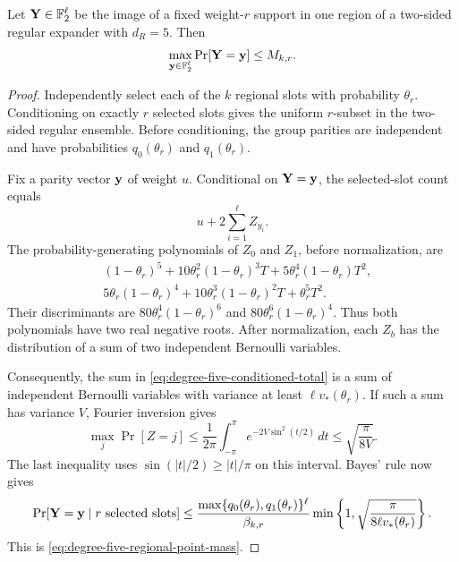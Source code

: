 \begin{lemma}
\label{lem:degree-five-point-mass}
Let $\mathbf Y\in\mathbb F_2^\ell$ be the image of a fixed weight-$r$ support in
one region of a two-sided regular expander with $d_R=5$.  Then
\begin{equation}
 \max_{\mathbf y\in\mathbb F_2^\ell}\Pr[\mathbf Y=\mathbf y]\leq M_{k,r}.
 \label{eq:degree-five-regional-point-mass}
\end{equation}
\end{lemma}

\begin{proof}
Independently select each of the $k$ regional slots with probability $\theta_r$.
Conditioning on exactly $r$ selected slots gives the uniform $r$-subset in
the two-sided regular ensemble.  Before conditioning, the group parities are
independent and have probabilities $q_0(\theta_r)$ and $q_1(\theta_r)$.

Fix a parity vector $\mathbf y$ of weight $u$.  Conditional on $\mathbf Y=\mathbf y$, the
selected-slot count equals
\begin{equation}
 u+2\sum_{i=1}^{\ell} Z_{y_i}.
 \label{eq:degree-five-conditioned-total}
\end{equation}
The probability-generating polynomials of $Z_0$ and $Z_1$, before
normalization, are
\begin{align*}
 &(1-\theta_r)^5+10\theta_r^2(1-\theta_r)^3T
   +5\theta_r^4(1-\theta_r)T^2,\\
 &5\theta_r(1-\theta_r)^4+10\theta_r^3(1-\theta_r)^2T
   +\theta_r^5T^2.
\end{align*}
Their discriminants are $80\theta_r^4(1-\theta_r)^6$ and
$80\theta_r^6(1-\theta_r)^4$.  Thus both polynomials have two real negative
roots.
After normalization, each $Z_b$ has the distribution of a sum of two
independent Bernoulli variables.

Consequently, the sum in \eqref{eq:degree-five-conditioned-total} is a sum
of independent Bernoulli variables with variance at least
$\ell v_*(\theta_r)$.  If such a sum has variance $V$, Fourier inversion gives
\begin{equation}
 \max_j\Pr[Z=j]
 \leq\frac1{2\pi}\int_{-\pi}^{\pi}
 e^{-2V\sin^2(t/2)}\,dt
 \leq\sqrt{\frac{\pi}{8V}}.
 \label{eq:poisson-binomial-local-mass}
\end{equation}
The last inequality uses $\sin(|t|/2)\geq |t|/\pi$ on this interval.
Bayes' rule now gives
\begin{equation*}
 \Pr[\mathbf Y=\mathbf y\mid\text{$r$ selected slots}]
 \leq
 \frac{\max\{q_0(\theta_r),q_1(\theta_r)\}^{\ell}}{\beta_{k,r}}
 \min\left\{1,\sqrt{\frac{\pi}{8\ell v_*(\theta_r)}}\right\}.
\end{equation*}
This is \eqref{eq:degree-five-regional-point-mass}.
\end{proof}

